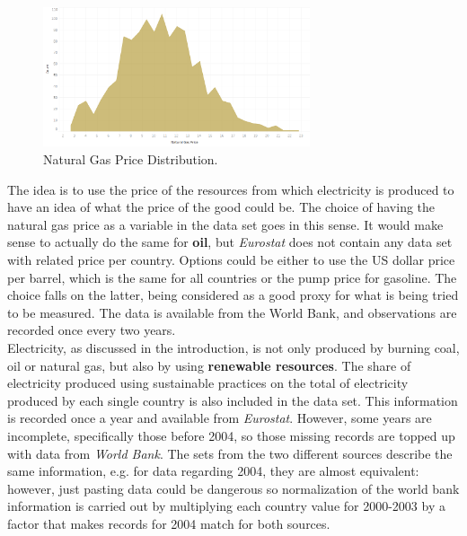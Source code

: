 \documentclass{book}
\begin{document}
\bigskip
\begin{figure}[H]
\begin{center}
\captionsetup{justification=centering}
\includegraphics[width=0.7\textwidth]{Images/nGas.png}
\caption{Natural Gas Price Distribution.}
\end{center}
\end{figure}
\bigskip

The idea is to use the price of the resources from which electricity is produced to have an idea of what the price of the good could be. The choice of having the natural gas price as a variable in the data set goes in this sense. It would make sense to actually do the same for \textbf{oil}, but \textit{Eurostat} does not contain any data set with related price per country. Options could be either to use the US dollar price per barrel, which is the same for all countries or the pump price for gasoline. The choice falls on the latter, being considered as a good proxy for what is being tried to be measured. The data is available from the World Bank, and observations are recorded once every two years.\\

Electricity, as discussed in the introduction, is not only produced by burning coal, oil or natural gas, but also by using \textbf{renewable resources}. The share of electricity produced using sustainable practices on the total of electricity produced by each single country is also included in the data set. This information is recorded once a year and available from \textit{Eurostat}. However, some years are incomplete, specifically those before 2004, so those missing records are topped up with data from \textit{World Bank}. The sets from the two different sources describe the same information, e.g. for data regarding 2004, they are almost equivalent: however, just pasting data could be dangerous so normalization of the world bank information is carried out by multiplying each country value for 2000-2003 by a factor that makes records for 2004 match for both sources. \\
\end{document}
